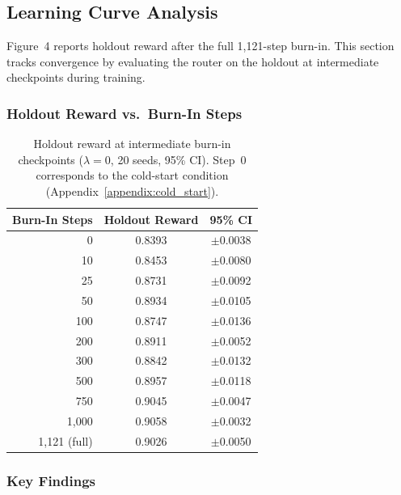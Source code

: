 
\subsection{Learning Curve Analysis}
\label{appendix:learning_curves}

Figure~4 reports holdout reward after the full 1,121-step burn-in.  This
section tracks convergence by evaluating the router on the holdout at
intermediate checkpoints during training.

\subsubsection{Holdout Reward vs.\ Burn-In Steps}

\begin{table}[h]
\centering
\caption{Holdout reward at intermediate burn-in checkpoints ($\lambda{=}0$,
20 seeds, 95\% CI).  Step~0 corresponds to the cold-start condition
(Appendix~\ref{appendix:cold_start}).}
\label{tab:learning_curve}
\small
\begin{tabular}{@{}rcc@{}}
\toprule
\textbf{Burn-In Steps} & \textbf{Holdout Reward} & \textbf{95\% CI} \\
\midrule
0          & 0.8393 & $\pm$0.0038 \\
10         & 0.8453 & $\pm$0.0080 \\
25         & 0.8731 & $\pm$0.0092 \\
50         & 0.8934 & $\pm$0.0105 \\
100        & 0.8747 & $\pm$0.0136 \\
200        & 0.8911 & $\pm$0.0052 \\
300        & 0.8842 & $\pm$0.0132 \\
500        & 0.8957 & $\pm$0.0118 \\
750        & 0.9045 & $\pm$0.0047 \\
1,000      & 0.9058 & $\pm$0.0032 \\
1,121 (full) & 0.9026 & $\pm$0.0050 \\
\bottomrule
\end{tabular}
\end{table}

\subsubsection{Key Findings}

